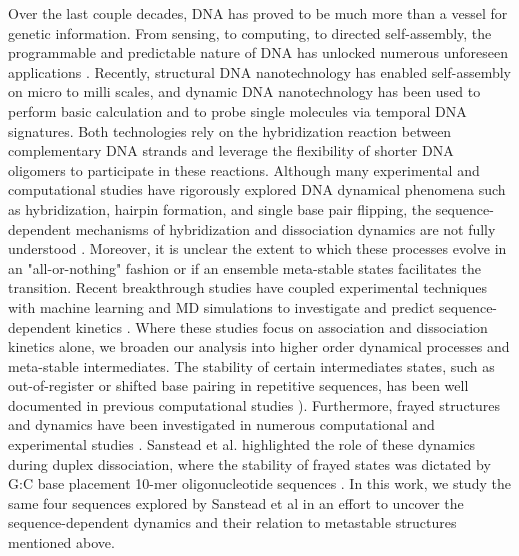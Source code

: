 \documentclass[journal=jpcbfk,manuscript=article]{achemso}
\begin{document}
Over the last couple decades, DNA has proved to be much more than a vessel for genetic information. From sensing, to computing, to directed self-assembly, the programmable and predictable nature of DNA has unlocked numerous unforeseen applications \citep{Seeman2017DNANanotechnology, Adleman1994MolecularProblems, Rothemund2006FoldingPatterns, Gu2010ALine}. Recently, structural DNA nanotechnology has enabled self-assembly on micro to milli scales, and dynamic DNA nanotechnology has been used to perform basic calculation and to probe single molecules via temporal DNA signatures\citep{MhatreV.HoJi-AnnLee2012NIHAccess, Bui2018, Shah2019}. Both technologies rely on the hybridization reaction between complementary DNA strands and leverage the flexibility of shorter DNA oligomers to participate in these reactions. Although many experimental and computational studies have rigorously explored DNA dynamical phenomena such as hybridization, hairpin formation, and single base pair flipping, the sequence-dependent mechanisms of hybridization and dissociation dynamics are not fully understood \citep{Yin2011KineticsHybridization, Xiao2019, Hinckley2014Coarse-grainedEffects, Sanstead2016, Porschke1971CooperativeTransition, Porschke1973ThermodynamicsPairs, Chen2007InfluenceHybridization, Craig1971ElaxationOligon}. Moreover, it is unclear the extent to which these processes evolve in an "all-or-nothing" fashion or if an ensemble meta-stable states facilitates the transition. Recent breakthrough studies have coupled experimental techniques with machine learning and MD simulations to investigate and predict sequence-dependent kinetics \citep{Schickinger2018TetheredHelices, Zhang2018PredictingSequence}. Where these studies focus on association and dissociation kinetics alone, we broaden our analysis into higher order dynamical processes and meta-stable intermediates. The stability of certain intermediates states, such as out-of-register or shifted base pairing in repetitive sequences, has been well documented in previous computational studies \citep{Phys2014, Xiao2019, Maciejczyk2014DNAModel}). Furthermore, frayed structures and dynamics have been investigated in numerous computational and experimental studies \citep{Zgarbova2014BaseRNA, Nonin1995TerminalFraying, Nikolova2012ProbingSimulations, Andreatta2006UltrafastHelix}. Sanstead et al. highlighted the role of these dynamics during duplex dissociation, where the stability of frayed states was dictated by G:C base placement 10-mer oligonucleotide sequences \citep{Sanstead2016}. In this work, we study the same four sequences explored by Sanstead et al in an effort to uncover the sequence-dependent dynamics and their relation to metastable structures mentioned above.
\end{document}

